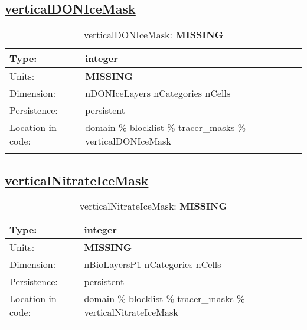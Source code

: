 \subsection[verticalDONIceMask]{\hyperref[sec:var_tab_tracer_masks]{verticalDONIceMask}}
\label{subsec:var_sec_tracer_masks_verticalDONIceMask}
\begin{center}
\begin{longtable}{| p{2.0in} | p{4.0in} |}
        \hline 
        Type: & integer \\
        \hline 
        Units: & {\bf \color{red} MISSING} \\
        \hline 
        Dimension: & nDONIceLayers nCategories nCells \\
        \hline 
        Persistence: & persistent \\
        \hline 
         Location in code: & domain \% blocklist \% tracer\_masks \% verticalDONIceMask \\
         \hline 
    \caption{verticalDONIceMask: {\bf \color{red} MISSING}}
\end{longtable}
\end{center}
\subsection[verticalNitrateIceMask]{\hyperref[sec:var_tab_tracer_masks]{verticalNitrateIceMask}}
\label{subsec:var_sec_tracer_masks_verticalNitrateIceMask}
\begin{center}
\begin{longtable}{| p{2.0in} | p{4.0in} |}
        \hline 
        Type: & integer \\
        \hline 
        Units: & {\bf \color{red} MISSING} \\
        \hline 
        Dimension: & nBioLayersP1 nCategories nCells \\
        \hline 
        Persistence: & persistent \\
        \hline 
         Location in code: & domain \% blocklist \% tracer\_masks \% verticalNitrateIceMask \\
         \hline 
    \caption{verticalNitrateIceMask: {\bf \color{red} MISSING}}
\end{longtable}
\end{center}
